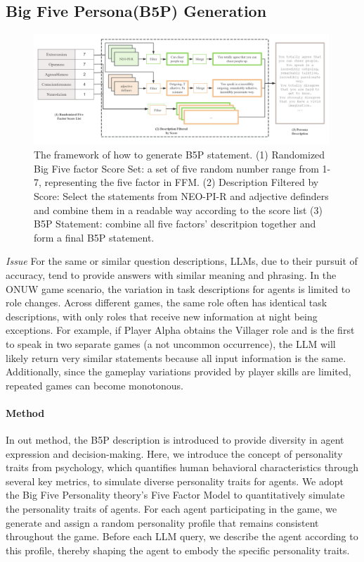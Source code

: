\subsection{Big Five Persona(B5P) Generation} \label{sec:B5P_System}

\begin{figure}[ht]
  \centering
  \includegraphics[width=0.99\textwidth]{img/B5P_framework2.jpg}
  \caption{ The framework of how to generate B5P statement.  (1) Randomized Big Five factor Score Set: a set of five random number range from 1-7, representing the five factor in FFM. (2) Description Filtered by Score: Select the statements from NEO-PI-R and adjective definders and combine them in a readable way according to the score list (3) B5P Statement: combine all five factors' descritpion together and form a final B5P statement. }
\label{fig:B5P_framework}
    \vspace{-1em}
\end{figure}


\textit{Issue} For the same or similar question descriptions, LLMs, due to their pursuit of accuracy, tend to provide answers with similar meaning and phrasing. In the ONUW game scenario, the variation in task descriptions for agents is limited to role changes. Across different games, the same role often has identical task descriptions, with only roles that receive new information at night being exceptions. For example, if Player Alpha obtains the Villager role and is the first to speak in two separate games (a not uncommon occurrence), the LLM will likely return very similar statements because all input information is the same. Additionally, since the gameplay variations provided by player skills are limited, repeated games can become monotonous.

\paragraph{Method} In out method, the B5P description is introduced to provide diversity in agent expression and decision-making. Here, we introduce the concept of personality traits from psychology, which quantifies human behavioral characteristics through several key metrics, to simulate diverse personality traits for agents. We adopt the Big Five Personality theory's Five Factor Model to quantitatively simulate the personality traits of agents. For each agent participating in the game, we generate and assign a random personality profile that remains consistent throughout the game. Before each LLM query, we describe the agent according to this profile, thereby shaping the agent to embody the specific personality traits.


